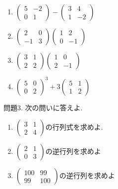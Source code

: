 \documentclass[dvipdfmx,a4paper,11pt]{article}
\theoremstyle{definition}
\begin{document}
 \begin{enumerate}
   \setlength{\parskip}{0cm} %
  \setlength{\itemsep}{0cm} %
\item 
$
 \begin{pmatrix} 5 & -2 \\ 0 & 1 \end{pmatrix}-  \begin{pmatrix} 3 & 4 \\ 1 & -2 \end{pmatrix}
$
\item $
\begin{pmatrix} 2 & 0 \\ -1 & 3 \end{pmatrix}\begin{pmatrix} 1 & 2 \\ 0 & -1 \end{pmatrix}
$
\item $
 \begin{pmatrix} 3 & 1 \\ 2 & 2 \end{pmatrix}\begin{pmatrix} 1 & 0 \\ 2 & -1 \end{pmatrix}
$
\item $
\begin{pmatrix} 5 & 0 \\ 0 & 2 \end{pmatrix}^3 + 3 \begin{pmatrix} 5 & 1 \\ 1 & 2 \end{pmatrix}
$
 \end{enumerate}
 
 \vspace{5pt}
 問題3. 次の問いに答えよ.

 \begin{enumerate}
   \setlength{\parskip}{0cm} %
  \setlength{\itemsep}{0cm} %
\item $ \begin{pmatrix} 3 & 1 \\ 2 & 4 \end{pmatrix}$の行列式を求めよ.
\item $ \begin{pmatrix} 2 & 1 \\ 0 & 3 \end{pmatrix}$の逆行列を求めよ
\item $ \begin{pmatrix} 100 & 99 \\ 99 & 100\end{pmatrix}$の逆行列を求めよ
 \end{enumerate}
 
\end{document}

